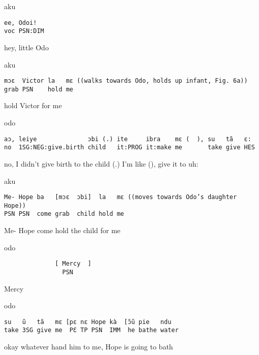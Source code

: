 \documentclass[output=paper]{langsci/langscibook}
\begin{document}
\vspace{2mm}
%
\begin{transbox}{1}{aku}
\begin{verbatim}
ee, Odoi!
voc PSN:DIM
\end{verbatim}
hey, little Odo
\end{transbox}
%
%
\begin{mdframednoverticalspace}[style=firstfoc]
\begin{transbox}{3}{aku}
\begin{verbatim}
mɔɛ  Victor la   mɛ ((walks towards Odo, holds up infant, Fig. 6a))
grab PSN    hold me
\end{verbatim}
hold Victor for me
\end{transbox}
\end{mdframednoverticalspace}
%
\begin{mdframednoverticalspace}[style=secondfoc]
\begin{transbox}{4}{odo}
\begin{verbatim}
aɔ, leiye              ɔbi (.) ite     ibra    mɛ (  ), su   tã   ɛ:
no  1SG:NEG:give.birth child   it:PROG it:make me       take give HES
\end{verbatim}
no, I didn’t give birth to the child (.) I’m like (\hspace{0.3cm}), give it to uh:
\end{transbox}
\end{mdframednoverticalspace}
%
%
\begin{transbox}{6}{aku}
\begin{verbatim}
Me- Hope ba   [mɔɛ  ɔbi]  la   mɛ ((moves towards Odo’s daughter Hope))
PSN PSN  come grab  child hold me
\end{verbatim}
Me- Hope come hold the child for me
\end{transbox}
%
\begin{transbox}{7}{odo}
\begin{verbatim}
              [ Mercy  ]
                PSN
\end{verbatim}
\hspace{2.3cm} Mercy
\end{transbox}
%
%
\begin{transbox}{9}{odo}
\begin{verbatim}
su   ũ   tã   mɛ [pɛ nɛ Hope kà  [ɔ̃ũ pie   ndu
take 3SG give me  PƐ TP PSN  IMM  he bathe water
\end{verbatim}
okay whatever hand him to me, Hope is going to bath
\end{transbox}
\end{document}
